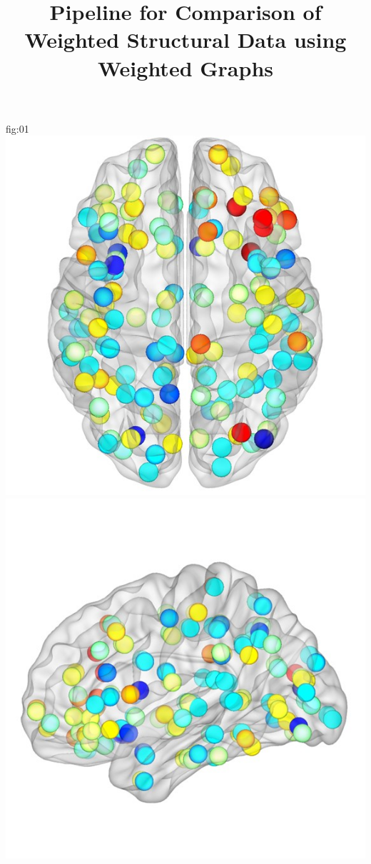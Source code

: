 \documentclass[justified]{tufte-handout}
\title{Pipeline for Comparison of Weighted Structural Data using Weighted Graphs}
\begin{document}
\maketitle

{fig:01}
{
	\includegraphics{fig_01_01.jpg}
	\includegraphics{fig_01_02.jpg}
}
\end{document}
